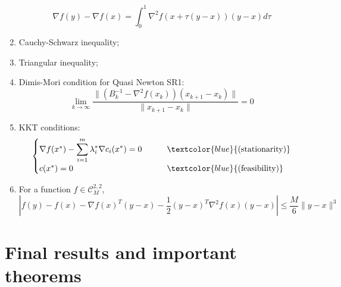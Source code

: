 \documentclass[12pt, openany]{report}
\newcommand{\C}{\mathcal{C}}
\theoremstyle{definition}
\begin{document}
\begin{enumerate}
\begin{equation}
		\nabla f(y) - \nabla f(x) = \int_0^1 \nabla^2 f(x + \tau(y-x))(y-x)d\tau
	\end{equation}
	\item Cauchy-Schwarz inequality;
	\item Triangular inequality;
	\item Dimis-Mori condition for Quasi Newton SR1:
	\begin{equation}
		\lim_{k\to \infty} \frac{\|\left(B_k^{-1}-\nabla^2f(x_k)\right)(x_{k+1}-x_k)\|}{\|x_{k+1}-x_k\|} = 0
	\end{equation}
	\item KKT conditions:
	\begin{equation}
	\begin{cases}
		\nabla f(x^*) - \displaystyle \sum_{i=1}^m \lambda_i^* \nabla c_i(x^*) = 0  \quad \quad &\textcolor{blue}{\text{(stationarity)}}\\
		c(x^*) = 0 &\textcolor{blue}{\text{(feasibility)}}
	\end{cases}
	\end{equation}
	\item For a function $f\in \C^{2,2}_M$, 
	\begin{equation}
		\left|f(y)-f(x)-\nabla f(x)^T (y-x)-\frac{1}{2}(y-x)^T \nabla^2f(x)(y-x)\right| \le \frac{M}{6}\|y-x\|^3
	\end{equation}
\end{enumerate}
\chapter{Final results and important theorems}
\end{document}
